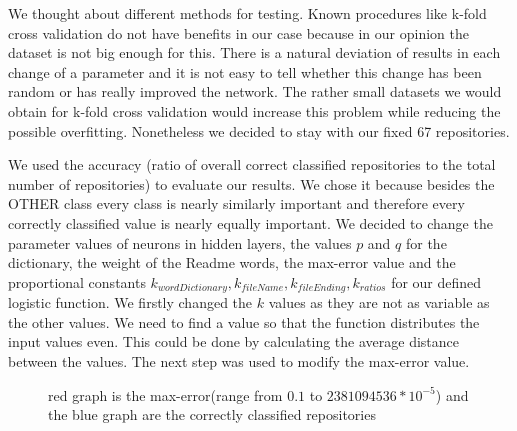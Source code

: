 \documentclass[paper=A4,pagesize=auto,12pt,headinclude=true,footinclude=true,BCOR=0mm,DIV=calc]{scrartcl}
\begin{document}
	 We thought about different methods for testing. Known procedures like k-fold cross validation do not have benefits in our case because in our opinion the dataset is not big enough for this. There is a natural deviation of results in each change of a parameter and it is not easy to tell whether this change has been random or has really improved the network. The rather small datasets we would obtain for k-fold cross validation would increase this problem while reducing the possible overfitting. Nonetheless we decided to stay with our fixed 67 repositories.
	 
	We used the accuracy (ratio of overall correct classified repositories to the total number of repositories) to evaluate our results. We chose it because besides the OTHER class every class is nearly similarly important and therefore every correctly classified value is nearly equally important.
	We decided to change the parameter values of neurons in hidden layers, the values $p$ and $q$ for the dictionary, the weight of the Readme words, the max-error value and the proportional constants $k_{wordDictionary}, k_{fileName}, k_{fileEnding}, k_{ratios}$ for our defined logistic function.
	We firstly changed the $k$ values as they are not as variable as the other values. We need to find a value so that the function distributes the input values even. This could be done by calculating the average distance between the values.
	The next step was used to modify the max-error value.
		\begin{figure}[H]
			\caption{red graph is the max-error(range from $0.1$ to $2381094536 * 10^{-5}$) and the blue graph are the correctly classified repositories}
		\end{figure}
		
\end{document}
